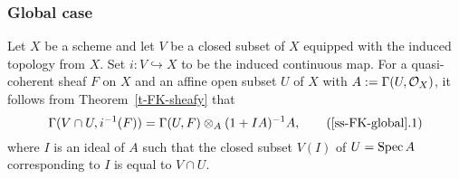 \subsubsection{Global case}\label{ss-FK-global}

Let $X$ be a scheme and let $V$ be a closed subset of $X$ equipped with the induced topology from $X$. 
Set $i:V \hookrightarrow X$ to be the induced continuous map. 
For a quasi-coherent sheaf $F$ on $X$ and an affine open subset $U$ of $X$ with $A:=\Gamma(U, \mathcal{O}_X)$, 
it follows from Theorem~\ref{t-FK-sheafy} that 
\begin{equation}\label{e-FK-sheafy}
\Gamma(V \cap U, i^{-1}(F))=\Gamma(U, F) \otimes_A (1+IA)^{-1}A, 
\tag{\ref{ss-FK-global}.1}
\end{equation}
where $I$ is an ideal of $A$ such that 
the closed subset $V(I)$ of $U={\operatorname{Spec}}\,A$ corresponding to $I$ 
is equal to $V \cap U$. 


